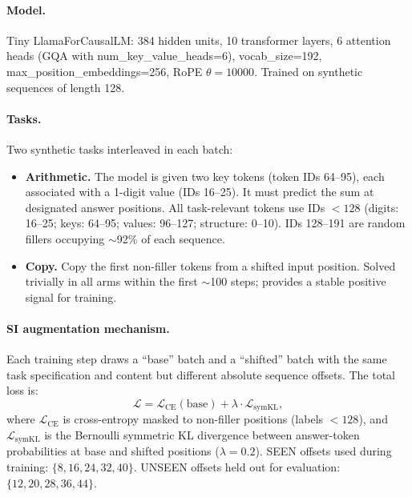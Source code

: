 \documentclass{article}
\begin{document}
\paragraph{Model.} Tiny LlamaForCausalLM: 384 hidden units, 10 transformer layers, 6 attention heads (GQA with num\_key\_value\_heads=6), vocab\_size=192, max\_position\_embeddings=256, RoPE $\theta = 10000$. Trained on synthetic sequences of length 128.

\paragraph{Tasks.} Two synthetic tasks interleaved in each batch:
\begin{itemize}
    \item \textbf{Arithmetic.} The model is given two key tokens (token IDs 64--95), each associated with a 1-digit value (IDs 16--25). It must predict the sum at designated answer positions. All task-relevant tokens use IDs $< 128$ (digits: 16--25; keys: 64--95; values: 96--127; structure: 0--10). IDs 128--191 are random fillers occupying $\sim$92\% of each sequence.
    \item \textbf{Copy.} Copy the first non-filler tokens from a shifted input position. Solved trivially in all arms within the first $\sim$100 steps; provides a stable positive signal for training.
\end{itemize}

\paragraph{SI augmentation mechanism.} Each training step draws a ``base'' batch and a ``shifted'' batch with the same task specification and content but different absolute sequence offsets. The total loss is:
\begin{equation}
    \mathcal{L} = \mathcal{L}_{\mathrm{CE}}(\text{base}) + \lambda \cdot \mathcal{L}_{\mathrm{symKL}},
\end{equation}
where $\mathcal{L}_{\mathrm{CE}}$ is cross-entropy masked to non-filler positions (labels $< 128$), and $\mathcal{L}_{\mathrm{symKL}}$ is the Bernoulli symmetric KL divergence between answer-token probabilities at base and shifted positions ($\lambda = 0.2$). SEEN offsets used during training: $\{8, 16, 24, 32, 40\}$. UNSEEN offsets held out for evaluation: $\{12, 20, 28, 36, 44\}$.
\end{document}
